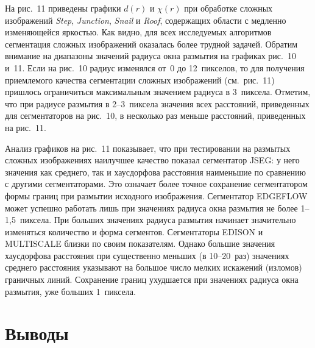 \begin{multicols}{2}
  На рис.~11 приведены графики $d(r)$ и $\chi(r)$ при обработке 
сложных изображений \textit{Step}, \textit{Junction}, \textit{Snail} и \textit{Roof}, 
содержащих области с медленно изменяющейся яркостью. Как видно, для всех 
исследуемых алгоритмов сегментация сложных изоб\-ра\-же\-ний оказалась более 
трудной задачей. Обратим внимание на диапазоны значений радиуса окна 
размытия на графиках рис.~10 и~11. Если на рис.~10 радиус изменялся от~0 до 
12~пикселов, то для получения приемлемого качества сегментации сложных 
изображений (см.\ рис.~11) пришлось ограничиться максимальным значением 
радиуса в 3~пиксела. Отметим, что при радиусе размытия в 2--3~пиксела 
значения всех расстояний, приведенных для сегментаторов на рис.~10, в 
несколько раз меньше расстояний, приведенных на рис.~11.
 
  Анализ графиков на рис.~11 показывает, что при тестировании на размытых 
сложных изображениях наилучшее качество показал сегментатор {JSEG}: 
у него значения как среднего, так и хаусдорфова расстояния наименьшие по 
сравнению с другими сегментаторами. Это означает более точное сохранение 
сегментатором формы границ при размытии исходного изображения. 
Сегментатор {EDGEFLOW} может успешно работать лишь при значениях 
радиуса окна размытия не более 1--1,5~пиксела. При больших значениях 
радиуса размытия начинает значительно изменяться количество и форма 
сегментов. Сегментаторы {EDISON} и {MULTISCALE} близки по 
своим показателям. Однако большие значения хаусдорфова расстояния при 
существенно меньших (в 10--20~раз) значениях среднего расстояния указывают 
на большое число мелких искажений (изломов) граничных линий. Сохранение 
границ ухудшается при значениях радиуса окна размытия, уже больших 
1~пиксела.
 
  \section{Выводы}
  

\end{multicols}
